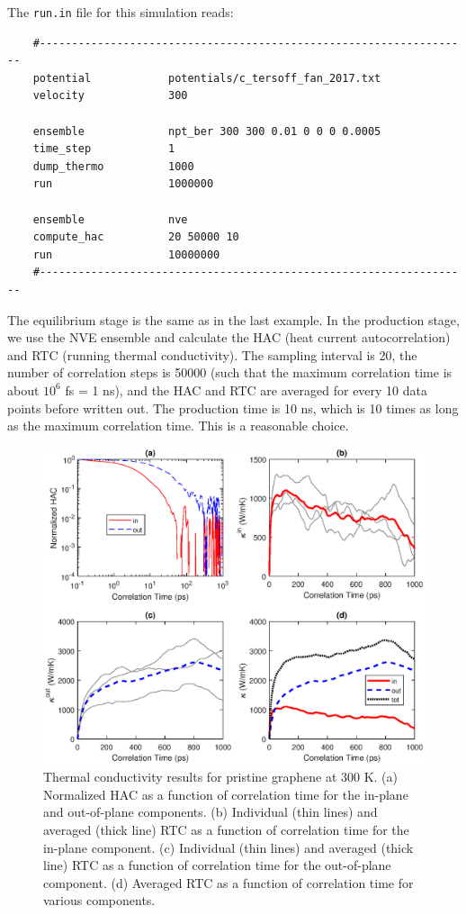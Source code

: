 \documentclass[12pt,a4paper]{report}
\begin{document}
The \verb"run.in" file for this simulation reads:
\begin{verbatim}
    #-------------------------------------------------------------------
    potential            potentials/c_tersoff_fan_2017.txt
    velocity             300

    ensemble             npt_ber 300 300 0.01 0 0 0 0.0005
    time_step            1
    dump_thermo          1000
    run                  1000000

    ensemble             nve
    compute_hac          20 50000 10
    run                  10000000
    #-------------------------------------------------------------------
\end{verbatim}

The equilibrium stage is the same as in the last example. In the production stage, we use the NVE ensemble and calculate the HAC (heat current autocorrelation) and RTC (running thermal conductivity). The sampling interval is 20, the number of correlation steps is 50000 (such that the maximum correlation time is about $10^6$ fs = 1 ns), and the HAC and RTC are averaged for every 10 data points before written out. The production time is 10 ns, which is 10 times as long as the maximum correlation time. This is a reasonable choice.


\begin{figure}[ht]
\begin{center}
\includegraphics[width=\columnwidth]{ex3.eps}
\caption{Thermal conductivity results for pristine graphene at 300 K. (a) Normalized HAC as a function of correlation time for the in-plane and out-of-plane components. (b) Individual (thin lines) and averaged (thick line) RTC as a function of correlation time for the in-plane component. (c) Individual (thin lines) and averaged (thick line) RTC as a function of correlation time for the out-of-plane component. (d) Averaged RTC as a function of correlation time for various components. }
\label{figure:ex3}
\end{center}
\end{figure}
\end{document}
